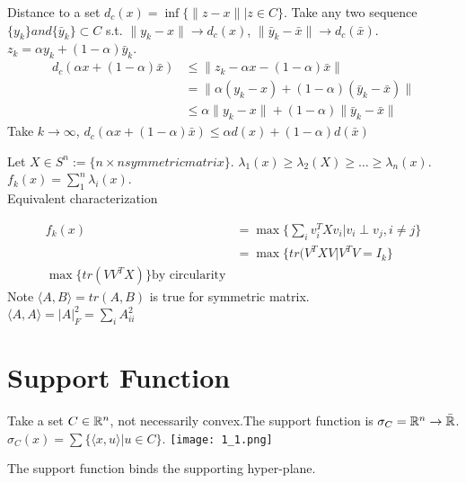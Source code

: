 \begin{example}[Distance]
Distance to a \cvx  set $d_c(x) = \inf \{ \| z-x \| | z \in C \}$. Take any two sequence $\{ y_k\} and \{ \bar{y}_k\} \subset C$ s.t. $\| y_k - x\| \to d_c(x)$, $\| \bar{y}_k - \bar{x}\| \to d_c(\bar{x})$. $z_k = \alpha y_k + (1 - \alpha) \bar{y}_k$.
\begin{align*}
d_c(\alpha x + (1-\alpha) \bar{x}) &\le \| z_k - \alpha x - (1 - \alpha) \bar{x}\| \\
& = \| \alpha(y_k - x) + (1 - \alpha)(\bar{y}_k - \bar{x})\| \\
& \le \alpha \| y_k - x\| + (1 - \alpha ) \|\bar{y}_k - \bar{x}\|
\end{align*}
Take $k \to \infty$, $d_c(\alpha x + (1 - \alpha) \bar{x}) \le \alpha d(x) + (1 - \alpha) d(\bar{x})$
\end{example}
\begin{example}[Eigenvalues]
Let $X \in S^n := \{ n \times n symmetric matrix\}$. $\lambda_1(x) \ge \lambda_2(X) \ge \ldots \ge \lambda_n(x)$.\\
$f_k(x) = \sum_{1}^n \lambda_i(x)$.\\
Equivalent characterization 

\begin{align*}
f_k(x) & = \max\{ \sum_{i} v_i^T Xv_i | v_i \perp v_j , i \neq j\} \\
& =  \max\{ tr( V^TXV | V^T V = I_k \} \\
\max \{tr(VV^TX) \} \text{by circularity}
\end{align*}
Note $\langle A,B\rangle  = tr(A,B)$ is true for symmetric matrix. \\
$\langle A,A\rangle  = |A |_F^2 = \sum_{i} A_{ii}^2$
\end{example}

\section{Support Function}
Take a set $C \in \mathbb{R}^n$, not necessarily convex.The support function is $\sigma_C = \mathbb{R}^n \to \bar{\mathbb{R}}$. $\sigma_C(x) = \sum \{ \langle x,u\rangle  | u \in C\}$.
\texttt{[image: 1\_1.png]}
\begin{fact}
The support function binds the supporting hyper-plane.
\end{fact}

